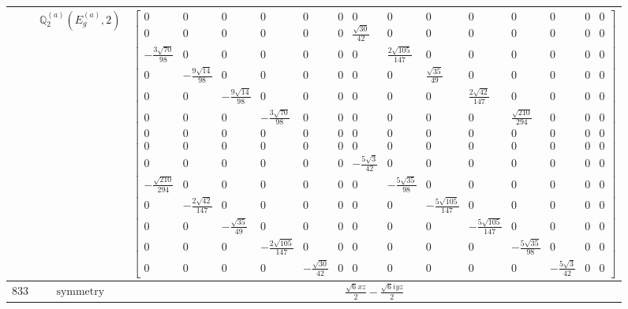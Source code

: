 \documentclass[fleqn,8pt,landscape]{jsarticle}
\begin{document}
\begin{longtable}{ccc}
$  $ & $ \mathbb{Q}_{2}^{(a)}(E_{g}^{(a)},2) $ & $ \begin{bmatrix} 0 & 0 & 0 & 0 & 0 & 0 & 0 & 0 & 0 & 0 & 0 & 0 & 0 & 0 \\ 0 & 0 & 0 & 0 & 0 & 0 & \frac{\sqrt{30}}{42} & 0 & 0 & 0 & 0 & 0 & 0 & 0 \\ - \frac{3 \sqrt{70}}{98} & 0 & 0 & 0 & 0 & 0 & 0 & \frac{2 \sqrt{105}}{147} & 0 & 0 & 0 & 0 & 0 & 0 \\ 0 & - \frac{9 \sqrt{14}}{98} & 0 & 0 & 0 & 0 & 0 & 0 & \frac{\sqrt{35}}{49} & 0 & 0 & 0 & 0 & 0 \\ 0 & 0 & - \frac{9 \sqrt{14}}{98} & 0 & 0 & 0 & 0 & 0 & 0 & \frac{2 \sqrt{42}}{147} & 0 & 0 & 0 & 0 \\ 0 & 0 & 0 & - \frac{3 \sqrt{70}}{98} & 0 & 0 & 0 & 0 & 0 & 0 & \frac{\sqrt{210}}{294} & 0 & 0 & 0 \\ 0 & 0 & 0 & 0 & 0 & 0 & 0 & 0 & 0 & 0 & 0 & 0 & 0 & 0 \\ 0 & 0 & 0 & 0 & 0 & 0 & 0 & 0 & 0 & 0 & 0 & 0 & 0 & 0 \\ 0 & 0 & 0 & 0 & 0 & 0 & - \frac{5 \sqrt{3}}{42} & 0 & 0 & 0 & 0 & 0 & 0 & 0 \\ - \frac{\sqrt{210}}{294} & 0 & 0 & 0 & 0 & 0 & 0 & - \frac{5 \sqrt{35}}{98} & 0 & 0 & 0 & 0 & 0 & 0 \\ 0 & - \frac{2 \sqrt{42}}{147} & 0 & 0 & 0 & 0 & 0 & 0 & - \frac{5 \sqrt{105}}{147} & 0 & 0 & 0 & 0 & 0 \\ 0 & 0 & - \frac{\sqrt{35}}{49} & 0 & 0 & 0 & 0 & 0 & 0 & - \frac{5 \sqrt{105}}{147} & 0 & 0 & 0 & 0 \\ 0 & 0 & 0 & - \frac{2 \sqrt{105}}{147} & 0 & 0 & 0 & 0 & 0 & 0 & - \frac{5 \sqrt{35}}{98} & 0 & 0 & 0 \\ 0 & 0 & 0 & 0 & - \frac{\sqrt{30}}{42} & 0 & 0 & 0 & 0 & 0 & 0 & - \frac{5 \sqrt{3}}{42} & 0 & 0 \end{bmatrix} $ \\ \hline
$ 833 $ & $ \text{symmetry} $ & $ \frac{\sqrt{6} x z}{2} - \frac{\sqrt{6} i y z}{2} $ \\

\end{longtable}
\end{document}
